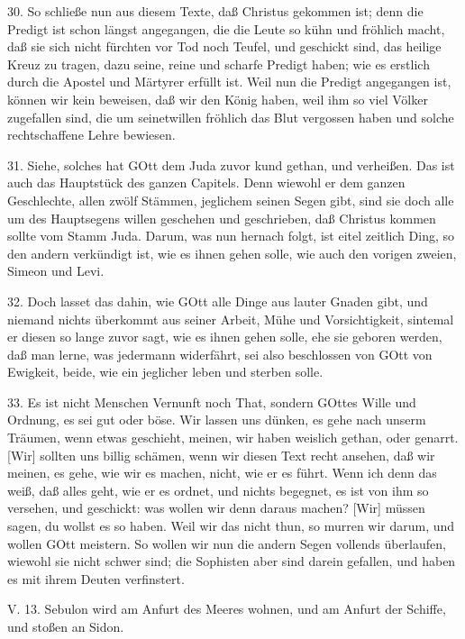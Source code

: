 30. So schließe nun aus diesem Texte, daß Christus gekommen ist; denn die Predigt ist schon längst angegangen, die die Leute so kühn und fröhlich macht, daß sie sich nicht fürchten vor Tod noch Teufel, und geschickt sind, das heilige Kreuz zu tragen, dazu seine, reine und scharfe Predigt haben; wie es erstlich durch die Apostel und Märtyrer erfüllt ist. Weil nun die Predigt angegangen ist, können wir kein beweisen, daß wir den König haben, weil ihm so viel Völker zugefallen sind, die um seinetwillen fröhlich das Blut vergossen haben und solche rechtschaffene Lehre bewiesen.

31. Siehe, solches hat GOtt dem Juda zuvor kund gethan, und verheißen. Das ist auch das Hauptstück des ganzen Capitels. Denn wiewohl er dem ganzen Geschlechte, allen zwölf Stämmen, jeglichem seinen Segen gibt, sind sie doch alle um des Hauptsegens willen geschehen und geschrieben, daß Christus kommen sollte vom Stamm Juda. Darum, was nun hernach folgt, ist eitel zeitlich Ding, so den andern verkündigt ist, wie es ihnen gehen solle, wie auch den vorigen zweien, Simeon und Levi.

32. Doch lasset das dahin, wie GOtt alle Dinge aus lauter Gnaden gibt, und niemand nichts überkommt aus seiner Arbeit, Mühe und Vorsichtigkeit, sintemal er diesen so lange zuvor sagt, wie es ihnen gehen solle, ehe sie geboren werden, daß man lerne, was jedermann widerfährt, sei also beschlossen von GOtt von Ewigkeit, beide, wie ein jeglicher leben und sterben solle.

33. Es ist nicht Menschen Vernunft noch That, sondern GOttes Wille und Ordnung, es sei gut oder böse. Wir lassen uns dünken, es gehe nach unserm Träumen, wenn etwas geschieht, meinen, wir haben weislich gethan, oder genarrt. [Wir] sollten uns billig schämen, wenn wir diesen Text recht ansehen, daß wir meinen, es gehe, wie wir es machen, nicht, wie er es führt. Wenn ich denn das weiß, daß alles geht, wie er es ordnet, und nichts begegnet, es ist von ihm so versehen, und geschickt: was wollen wir denn daraus machen? [Wir] müssen sagen, du wollst es so haben. Weil wir das nicht thun, so murren wir darum, und wollen GOtt meistern. So wollen wir nun die andern Segen vollends überlaufen, wiewohl sie nicht schwer sind; die Sophisten aber sind darein gefallen, und haben es mit ihrem Deuten verfinstert.

\begin{schriftzitat}
V. 13. Sebulon wird am Anfurt des Meeres wohnen, und am Anfurt der Schiffe, und stoßen an Sidon.
\end{schriftzitat}

